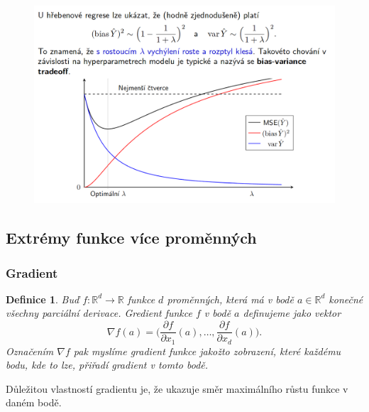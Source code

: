 \documentclass[12pt]{article}
\newtheorem{theorem}{Definice}
\begin{document}
\begin{figure}
\includegraphics[width=\linewidth]{graph}
\end{figure}


\subsection{Extrémy funkce více proměnných}
\subsubsection*{Gradient}
\begin{theorem}
Buď $f:\mathbb{R}^d\rightarrow\mathbb{R}$ funkce $d$ proměnných, která má v bodě $a\in\mathbb{R}^d$ konečné všechny parciální derivace. Gredient funkce $f$ v bodě $a$ definujeme jako vektor
\begin{equation}
\nabla f(a)=\Big( \frac{\partial f}{\partial x_1}(a), \ldots, \frac{\partial f}{\partial x_d}(a) \Big).
\end{equation}
Označením $\nabla f$ pak myslíme gradient funkce jakožto zobrazení, které každému bodu, kde to lze, přiřadí gradient v tomto bodě.
\end{theorem}
Důležitou vlastností gradientu je, že ukazuje směr maximálního růstu funkce v daném bodě. 
\end{document}
